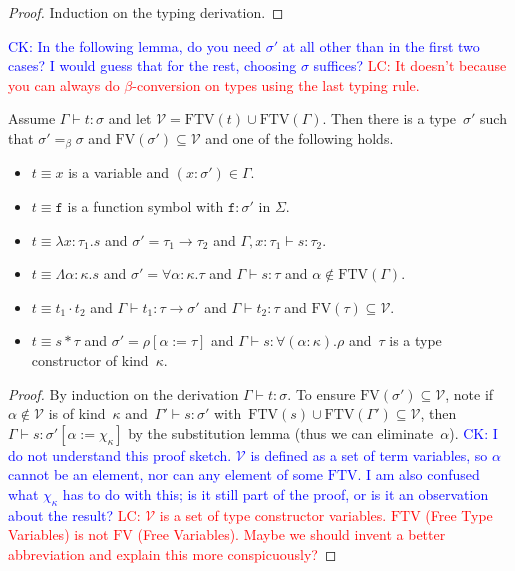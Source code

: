 \documentclass[a4paper,UKenglish,cleveref,autoref,numberwithinsect]{lipics-v2019}
\theoremstyle{definition}
\newcommand{\arrtype}{\rightarrow}
\newcommand{\quant}[2]{\forall #1.#2}
\newcommand{\app}[2]{#1 \cdot #2}
\newcommand{\tapp}[2]{#1 * #2}
\newcommand{\subst}[2]{#1:=#2}
\newcommand{\abs}[2]{\lambda #1.#2}
\newcommand{\tabs}[2]{\Lambda #1.#2}
\newcommand{\FTV}{\mathrm{FTV}}
\newcommand{\FV}{\mathrm{FV}}
\newcommand{\Vc}{\mathcal{V}}
\newcommand{\proves}{\vdash}
\newcommand{\CK}[1]{\textcolor{blue}{CK: #1}}
\newcommand{\LC}[1]{\textcolor{red}{LC: #1}}
\begin{document}
\begin{proof}
  Induction on the typing derivation.
\end{proof}

\CK{In the following lemma, do you need $\sigma'$ at all other than in
the first two cases? I would guess that for the rest, choosing $\sigma$
suffices?}
\LC{It doesn't because you can always do $\beta$-conversion on types using the last typing rule.}
\begin{lemma}
  Assume $\Gamma \proves t : \sigma$ and let $\Vc = \FTV(t) \cup
  \FTV(\Gamma)$. Then there is a type~$\sigma'$ such that $\sigma'
  =_\beta \sigma$ and $\FV(\sigma') \subseteq \Vc$ and one of the
  following holds.
  \begin{itemize}
  \item $t \equiv x$ is a variable and $(x : \sigma') \in \Gamma$.
  \item $t \equiv \mathtt{f}$ is a function symbol with $\mathtt{f} :
    \sigma'$ in $\Sigma$.
  \item $t \equiv \abs{x:\tau_1}{s}$ and
    $\sigma'=\tau_1\arrtype\tau_2$ and $\Gamma, x : \tau_1 \vdash s :
    \tau_2$.
  \item $t \equiv \tabs{\alpha:\kappa}{s}$ and $\sigma' =
    \quant{\alpha:\kappa}{\tau}$ and $\Gamma \vdash s : \tau$ and $\alpha
    \notin \FTV(\Gamma)$.
  \item $t \equiv \app{t_1}{t_2}$ and
    $\Gamma \vdash t_1 : \tau \arrtype \sigma'$ and
    $\Gamma \vdash t_2 : \tau$ and $\FV(\tau) \subseteq \Vc$.
  \item $t \equiv \tapp{s}{\tau}$ and
    $\sigma' = \rho[\subst{\alpha}{\tau}]$ and
    $\Gamma \vdash s : \quant{(\alpha:\kappa)}{\rho}$ and~$\tau$ is a
    type constructor of kind~$\kappa$.
  \end{itemize}
\end{lemma}

\begin{proof}
  By induction on the derivation $\Gamma \proves t : \sigma$. To
  ensure $\FV(\sigma') \subseteq \Vc$, note if $\alpha \notin \Vc$ is
  of kind~$\kappa$ and~$\Gamma' \proves s : \sigma'$ with~$\FTV(s)
  \cup \FTV(\Gamma') \subseteq \Vc$, then $\Gamma \proves s :
  \sigma'[\subst{\alpha}{\chi_\kappa}]$ by the substitution lemma
  (thus we can eliminate~$\alpha$).
\CK{I do not understand this proof sketch. $\Vc$ is defined as a set of
term variables, so $\alpha$ cannot be an element, nor can any element
of some $\FTV$.  I am also confused what $\chi_\kappa$ has to do with
this; is it still part of the proof, or is it an observation about the
result?}
\LC{$\Vc$ is a set of type constructor variables. $\FTV$ (Free Type
  Variables) is not $\FV$ (Free Variables). Maybe we should invent a
  better abbreviation and explain this more conspicuously?}
\end{proof}
\end{document}
